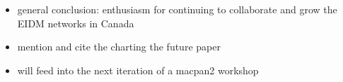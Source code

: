 \begin{itemize}
    \item general conclusion: enthusiasm for continuing to collaborate and grow the EIDM networks in Canada
    \item mention and cite the charting the future paper
    \item will feed into the next iteration of a macpan2 workshop
\end{itemize}